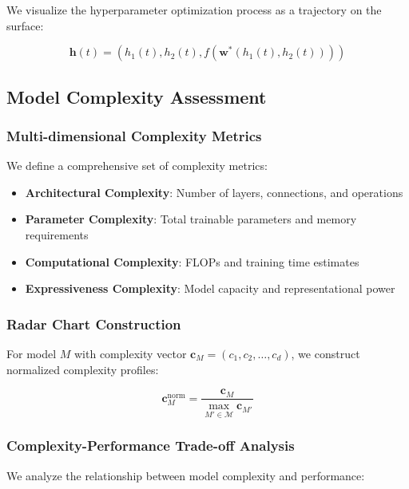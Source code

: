 \documentclass[12pt,a4paper]{article}
\begin{document}
We visualize the hyperparameter optimization process as a trajectory on the surface:

\begin{equation}
    \mathbf{h}(t) = (h_1(t), h_2(t), f(\mathbf{w}^*(h_1(t), h_2(t))))
\end{equation}

\subsection{Model Complexity Assessment}
\label{subsec:complexity}

\subsubsection{Multi-dimensional Complexity Metrics}

We define a comprehensive set of complexity metrics:

\begin{itemize}
    \item \textbf{Architectural Complexity}: Number of layers, connections, and operations
    \item \textbf{Parameter Complexity}: Total trainable parameters and memory requirements
    \item \textbf{Computational Complexity}: FLOPs and training time estimates
    \item \textbf{Expressiveness Complexity}: Model capacity and representational power
\end{itemize}

\subsubsection{Radar Chart Construction}

For model \( M \) with complexity vector \( \mathbf{c}_M = (c_1, c_2, \dots, c_d) \), we construct normalized complexity profiles:

\begin{equation}
    \mathbf{c}_M^{\text{norm}} = \frac{\mathbf{c}_M}{\max_{M' \in \mathcal{M}} \mathbf{c}_{M'}}
\end{equation}

\subsubsection{Complexity-Performance Trade-off Analysis}

We analyze the relationship between model complexity and performance:
\end{document}
